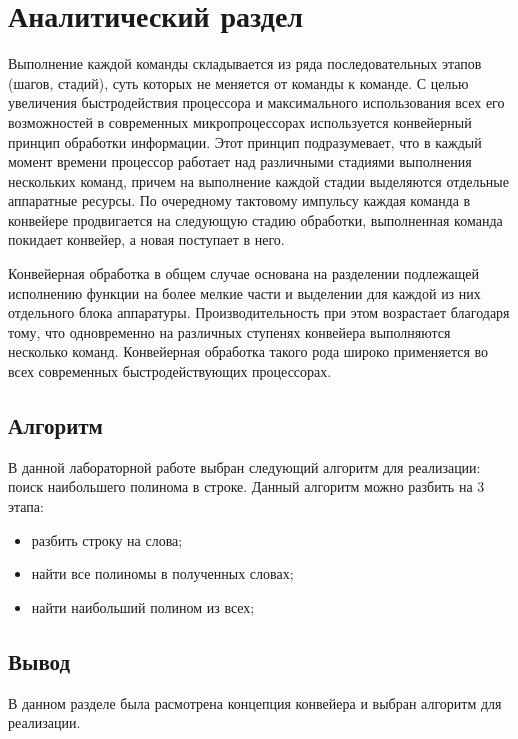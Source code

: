 \chapter{Аналитический раздел}
Выполнение каждой команды складывается из ряда последовательных этапов (шагов, стадий), суть которых не меняется от команды к команде. С целью увеличения быстродействия процессора и максимального использования всех его возможностей в современных микропроцессорах используется конвейерный принцип обработки информации. Этот принцип подразумевает, что в каждый момент времени процессор работает над различными стадиями выполнения нескольких команд, причем на выполнение каждой стадии выделяются отдельные аппаратные ресурсы. По очередному тактовому импульсу каждая команда в конвейере продвигается на следующую стадию обработки, выполненная команда покидает конвейер, а новая поступает в него.

Конвейерная обработка в общем случае основана на разделении подлежащей исполнению функции на более мелкие части и выделении для каждой из них отдельного блока аппаратуры. Производительность при этом возрастает благодаря тому, что одновременно на различных ступенях конвейера выполняются несколько команд. Конвейерная обработка такого рода широко применяется во всех современных быстродействующих процессорах.

\section{Алгоритм}
В данной лабораторной работе выбран следующий алгоритм для реализации: поиск наибольшего полинома в строке. Данный алгоритм можно разбить на 3 этапа:

\begin{itemize}
	\item разбить строку на слова;
	\item найти все полиномы в полученных словах;
	\item найти наибольший полином из всех;
\end{itemize}


\section{Вывод}

В данном разделе была расмотрена концепция конвейера и выбран алгоритм для реализации.